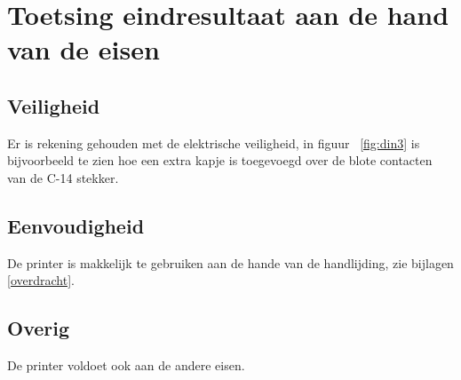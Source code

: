 \chapter{Toetsing eindresultaat aan de hand van de eisen}
\label{Toetsing_eindresultaat_aan_de_hand_van_de_eisen}

\section{Veiligheid}

Er is rekening gehouden met de elektrische veiligheid, in figuur
~\ref{fig:din3} is bijvoorbeeld te zien hoe een extra kapje is toegevoegd over
de blote contacten van de C-14 stekker.

\section{Eenvoudigheid}

De printer is makkelijk te gebruiken aan de hande van de handlijding, zie bijlagen \ref{overdracht}.

\section{Overig}

De printer voldoet ook aan de andere eisen.

